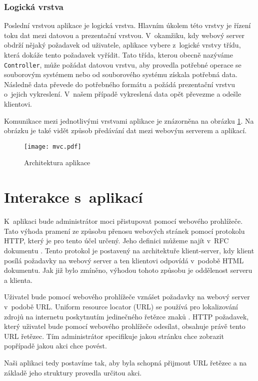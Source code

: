         \subsubsection{Logická vrstva}
        Poslední vrstvou aplikace je logická vrstva. Hlavním úkolem této vrstvy je řízení toku dat mezi datovou a prezentační vrstvou. V~okamžiku, kdy webový server obdrží nějaký požadavek od uživatele, aplikace vybere z~logické vrstvy třídu, která dokáže tento požadavek vyřídit. Tato třída, kterou obecně nazýváme \verb|Controller|, může požádat datovou vrstvu, aby provedla potřebné operace se souborovým systémem nebo od souborového systému získala potřebná data. Následně data převede do potřebného formátu a požádá prezentační vrstvu o~jejich vykreslení. V~našem případě vykreslená data opět převezme a odešle klientovi.

        Komunikace mezi jednotlivými vrstvami aplikace je znázorněna na obrázku \ref{mvc}. Na obrázku je také vidět způsob předávání dat mezi webovým serverem a aplikací.

    \begin{figure}
        \centering
        \texttt{[image: mvc.pdf]}
        \caption{Architektura aplikace}
        \label{mvc}
    \end{figure}
\section{Interakce s~aplikací}
K~aplikaci bude administrátor moci přistupovat pomocí webového prohlížeče. Tato výhoda pramení ze způsobu přenosu webových stránek pomocí protokolu HTTP, který je pro tento účel určený. Jeho definici můžeme najít v~RFC dokumentu \cite{RFC2616}. Tento protokol je postavený na architektuře klient-server, kdy klient posílá požadavky na webový server a ten klientovi odpovídá v~podobě HTML dokumentu. Jak již bylo zmíněno, výhodou tohoto způsobu je oddělenost serveru a klienta.

Uživatel bude pomocí webového prohlížeče vznášet požadavky na webový server v~podobě URL. Uniform resource locator (URL) se používá pro lokalizování zdrojů na internetu poskytnutím jedinečného řetězce znaků \cite{RFC3986}. HTTP požadavek, který uživatel bude pomocí webového prohlížeče odesílat, obsahuje právě tento URL řetězec. Tím administrátor specifikuje jakou stránku chce zobrazit popřípadě jakou akci chce povést.

Naši aplikaci tedy postavíme tak, aby byla schopná přijmout URL řetězec a na základě jeho struktury provedla určitou akci.

